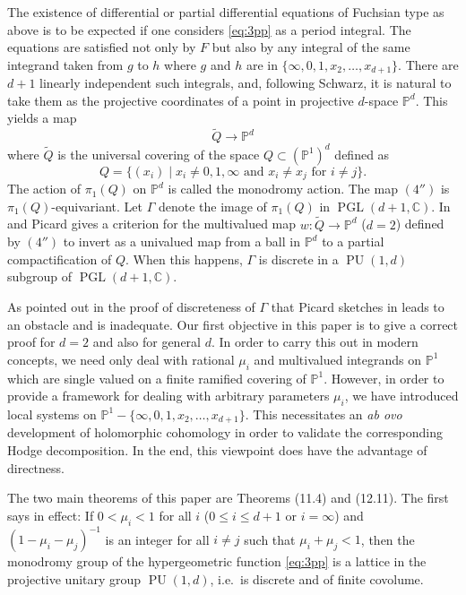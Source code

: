 \documentclass[12pt,a4paper]{article}
\theoremstyle{plain}
\theoremstyle{definition}
\theoremstyle{remark}
\DeclareMathOperator{\PGL}{PGL}
\DeclareMathOperator{\PU}{PU}
\newcommand{\CC}{\mathbb{C}}
\newcommand{\PP}{\mathbb{P}}
\numberwithin{equation}{section}
\providecommand{\CC}{\mathbb{C}}
\providecommand{\PP}{\mathbb{P}}
\providecommand{\PGL}{\operatorname{PGL}}
\begin{document}
The existence of differential or partial differential equations of Fuchsian type as above is to be expected if one considers \eqref{eq:3pp} as a period integral. The equations are satisfied not only by $F$ but also by any integral of the same integrand taken from $g$ to $h$ where $g$ and $h$ are in $\{\infty, 0, 1, x_2, \ldots, x_{d+1}\}$. There are $d+1$ linearly independent such integrals, and, following Schwarz, it is natural to take them as the projective coordinates of a point in projective $d$-space $\PP^d$. This yields a map
\begin{equation*}\tag{$4''$}
\widetilde{Q} \to \PP^d
\end{equation*}
where $\widetilde{Q}$ is the universal covering of the space $Q \subset (\PP^1)^d$ defined as
\[
Q = \{(x_i) \mid x_i \neq 0, 1, \infty \text{ and } x_i \neq x_j \text{ for } i \neq j\}.
\]
The action of $\pi_1(Q)$ on $\PP^d$ is called the monodromy action. The map $(4'')$ is $\pi_1(Q)$-equivariant. Let $\Gamma$ denote the image of $\pi_1(Q)$ in $\PGL(d+1, \CC)$. In \cite{Picard16a} and \cite{Picard16b} Picard gives a criterion for the multivalued map $w : \widetilde{Q} \to \PP^d$ ($d = 2$) defined by $(4'')$ to invert as a univalued map from a ball in $\PP^d$ to a partial compactification of $Q$. When this happens, $\Gamma$ is discrete in a $\PU(1,d)$ subgroup of $\PGL(d+1, \CC)$.

As pointed out in \cite{DM} the proof of discreteness of $\Gamma$ that Picard sketches in \cite{Picard16a} leads to an obstacle and is inadequate. Our first objective in this paper is to give a correct proof for $d = 2$ and also for general $d$. In order to carry this out in modern concepts, we need only deal with rational $\mu_i$ and multivalued integrands on $\PP^1$ which are single valued on a finite ramified covering of $\PP^1$. However, in order to provide a framework for dealing with arbitrary parameters $\mu_i$, we have introduced local systems on $\PP^1 - \{\infty, 0, 1, x_2, \ldots, x_{d+1}\}$. This necessitates an \textit{ab ovo} development of holomorphic cohomology in order to validate the corresponding Hodge decomposition. In the end, this viewpoint does have the advantage of directness.

The two main theorems of this paper are Theorems (11.4) and (12.11). The first says in effect: If $0 < \mu_i < 1$ for all $i$ ($0 \leq i \leq d+1$ or $i = \infty$) and $(1 - \mu_i - \mu_j)^{-1}$ is an integer for all $i \neq j$ such that $\mu_i + \mu_j < 1$, then the monodromy group of the hypergeometric function \eqref{eq:3pp} is a lattice in the projective unitary group $\PU(1,d)$, i.e.\ is discrete and of finite covolume.
\end{document}
